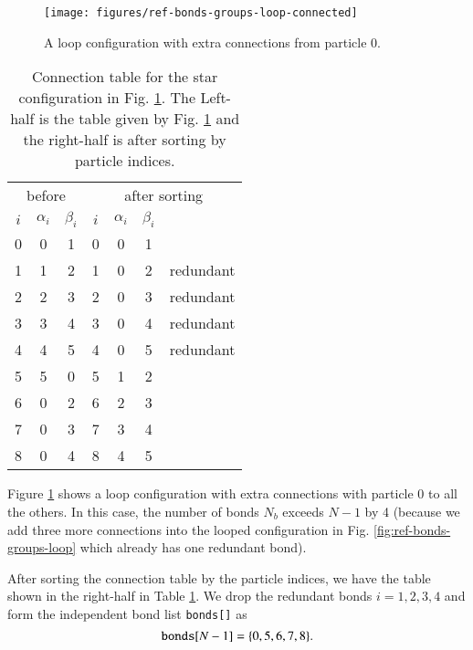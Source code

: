 \begin{figure}
  \centering
  \texttt{[image: figures/ref-bonds-groups-loop-connected]}
  \caption{
    A loop configuration with extra connections from particle 0.
  }
  \label{fig:ref-bonds-groups-loop-connected}
\end{figure}
\begin{table}[!htb]
  \begin{tabular}{ccc|cccc}
    \multicolumn{3}{c|}{before} &
    \multicolumn{4}{c}{after sorting} \\
    $i$ & $\alpha_{i}$ & $\beta_{i}$ & 
    $i$ & $\alpha_{i}$ & $\beta_{i}$ & \\
    \hline
    0 & 0 & 1 & 0 & 0 & 1 & \\
    1 & 1 & 2 & 1 & 0 & 2 & redundant\\
    2 & 2 & 3 & 2 & 0 & 3 & redundant\\
    3 & 3 & 4 & 3 & 0 & 4 & redundant\\
    4 & 4 & 5 & 4 & 0 & 5 & redundant\\
    5 & 5 & 0 & 5 & 1 & 2 & \\
    6 & 0 & 2 & 6 & 2 & 3 & \\
    7 & 0 & 3 & 7 & 3 & 4 & \\
    8 & 0 & 4 & 8 & 4 & 5 & 
  \end{tabular}
  \caption{%
    Connection table for the star configuration
    in Fig. \ref{fig:ref-bonds-groups-loop-connected}.
    The Left-half is the table given by 
    Fig. \ref{fig:ref-bonds-groups-loop-connected} 
    and the right-half is after sorting by particle indices. 
  }
  \label{tab:ref-bonds-groups-loop-connected}
\end{table}
Figure \ref{fig:ref-bonds-groups-loop-connected} shows a loop configuration 
with extra connections with particle 0 to all the others. 
In this case, the number of bonds $N_{b}$ exceeds $N-1$ by 4 
(because we add three more connections into the looped configuration 
in Fig. \ref{fig:ref-bonds-groups-loop} which already has one redundant bond). 

After sorting the connection table by the particle indices, 
we have the table shown in the right-half in Table \ref{tab:ref-bonds-groups-loop-connected}. 
We drop the redundant bonds $i=1, 2, 3, 4$ and form the independent 
bond list {\tt bonds[]} as 
\begin{equation}
  {\tt bonds}[N-1] = \{0, 5, 6, 7, 8\}.
\end{equation}



